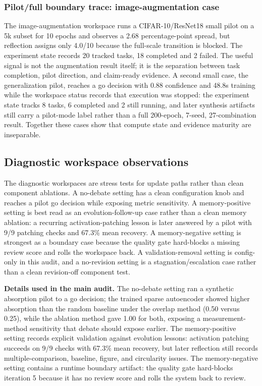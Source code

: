 \documentclass{article}
\begin{document}
\subsubsection{Pilot/full boundary trace: image-augmentation case}

The image-augmentation workspace runs a CIFAR-10/ResNet18 small pilot on a 5k subset for 10 epochs and observes a 2.68 percentage-point spread, but reflection assigns only 4.0/10 because the full-scale transition is blocked. The experiment state records 20 tracked tasks, 18 completed and 2 failed. The useful signal is not the augmentation result itself; it is the separation between task completion, pilot direction, and claim-ready evidence. A second small case, the generalization pilot, reaches a go decision with 0.88 confidence and 48.8s training while the workspace status records that execution was stopped: the experiment state tracks 8 tasks, 6 completed and 2 still running, and later synthesis artifacts still carry a pilot-mode label rather than a full 200-epoch, 7-seed, 27-combination result. Together these cases show that compute state and evidence maturity are inseparable.

\subsection{Diagnostic workspace observations}

The diagnostic workspaces are stress tests for update paths rather than clean component ablations. A no-debate setting has a clean configuration knob and reaches a pilot go decision while exposing metric sensitivity. A memory-positive setting is best read as an evolution-follow-up case rather than a clean memory ablation: a recurring activation-patching lesson is later answered by a pilot with 9/9 patching checks and 67.3\% mean recovery. A memory-negative setting is strongest as a boundary case because the quality gate hard-blocks a missing review score and rolls the workspace back. A validation-removal setting is config-only in this audit, and a no-revision setting is a stagnation/escalation case rather than a clean revision-off component test.

\textbf{Details used in the main audit.} The no-debate setting ran a synthetic absorption pilot to a go decision; the trained sparse autoencoder showed higher absorption than the random baseline under the overlap method (0.50 versus 0.25), while the ablation method gave 1.00 for both, exposing a measurement-method sensitivity that debate should expose earlier. The memory-positive setting records explicit validation against evolution lessons: activation patching succeeds on 9/9 checks with 67.3\% mean recovery, but later reflection still records multiple-comparison, baseline, figure, and circularity issues. The memory-negative setting contains a runtime boundary artifact: the quality gate hard-blocks iteration 5 because it has no review score and rolls the system back to review.
\end{document}
